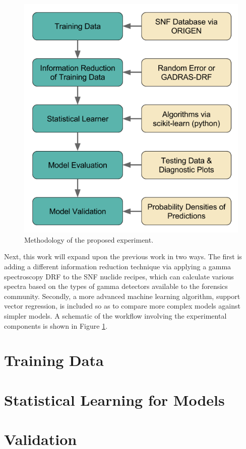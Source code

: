 \begin{figure}[H]
  \includegraphics[width=0.9\linewidth]{./chapters/demo_method/methodology.png}
  \caption{Methodology of the proposed experiment.}
  \label{fig:method}
\end{figure}

Next, this work will expand upon the previous work in two ways.  The first is
adding a different information reduction technique via applying a gamma
spectroscopy \gls{DRF} to the \gls{SNF} nuclide recipes, which can calculate
various spectra based on the types of gamma detectors available to the
forensics community.  Secondly, a more advanced machine learning algorithm,
support vector regression, is included so as to compare more complex models
against simpler models.  A schematic of the workflow involving the experimental
components is shown in Figure \ref{fig:method}.

\section{Training Data}
\label{sec:training}


\section{Statistical Learning for Models}
\label{sec:statmodel}


\section{Validation}
\label{sec:valid}

